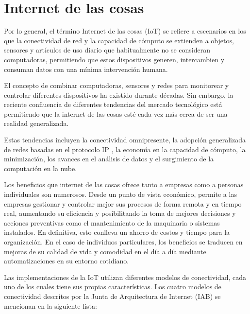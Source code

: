 

\section{Internet de las cosas}

Por lo general, el término Internet de las cosas (IoT) se refiere a escenarios en los que la conectividad de red y la capacidad de cómputo se extienden a objetos, sensores y artículos de uso diario que habitualmente no se consideran computadoras, permitiendo que estos dispositivos generen, intercambien y consuman datos con una mínima intervención humana.  

El concepto de combinar computadoras, sensores y redes para monitorear y controlar diferentes dispositivos ha existido durante décadas. Sin embargo, la reciente confluencia de diferentes tendencias del mercado tecnológico está permitiendo que la internet de las cosas esté cada vez más cerca de ser una realidad generalizada.  

Estas tendencias incluyen la conectividad omnipresente, la adopción generalizada de redes basadas en el protocolo IP \citep{WEBSITE:9}, la economía en la capacidad de cómputo, la minimización, los avances en el análisis de datos y el surgimiento de la computación en la nube.

Los beneficios que internet de las cosas ofrece tanto a empresas como a personas individuales son numerosos. Desde un punto de vista económico, permite a las empresas gestionar y controlar mejor sus procesos de forma remota y en tiempo real, aumentando su eficiencia y posibilitando la toma de mejores decisiones y acciones preventivas como el mantenimiento de la maquinaria o sistemas instalados. En definitiva, esto conlleva un ahorro de costos y tiempo para la organización. En el caso de individuos particulares, los beneficios se traducen en mejoras de su calidad de vida y comodidad en el día a día mediante automatizaciones en su entorno cotidiano.

Las implementaciones de la IoT utilizan diferentes modelos de conectividad, cada uno de los cuales tiene sus propias características. Los cuatro modelos de conectividad descritos por la Junta de Arquitectura de Internet (IAB)\citep{WEBSITE:5} se mencionan en la siguiente lista:

